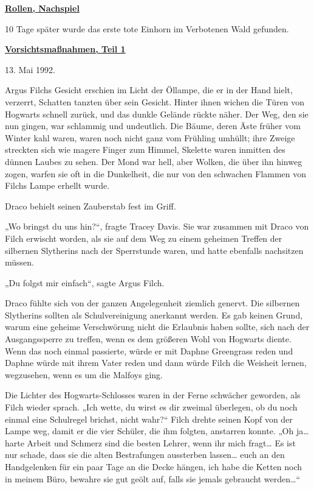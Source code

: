 

\hypertarget{rollen-nachspiel-vorsichtsmauxdfnahmen-teil-1}{%

\textbf{\uline{Rollen, Nachspiel}}

10 Tage später wurde das erste tote Einhorn im Verbotenen Wald gefunden.

\textbf{\uline{Vorsichtsmaßnahmen, Teil 1}}

13. Mai 1992.

Argus Filchs Gesicht erschien im Licht der Öllampe, die er in der Hand hielt, verzerrt, Schatten tanzten über sein Gesicht. Hinter ihnen wichen die Türen von Hogwarts schnell zurück, und das dunkle Gelände rückte näher. Der Weg, den sie nun gingen, war schlammig und undeutlich. Die Bäume, deren Äste früher vom Winter kahl waren, waren noch nicht ganz vom Frühling umhüllt; ihre Zweige streckten sich wie magere Finger zum Himmel, Skelette waren inmitten des dünnen Laubes zu sehen. Der Mond war hell, aber Wolken, die über ihn hinweg zogen, warfen sie oft in die Dunkelheit, die nur von den schwachen Flammen von Filchs Lampe erhellt wurde.

Draco behielt seinen Zauberstab fest im Griff.

„Wo bringst du uns hin?“, fragte Tracey Davis. Sie war zusammen mit Draco von Filch erwischt worden, als sie auf dem Weg zu einem geheimen Treffen der silbernen Slytherins nach der Sperrstunde waren, und hatte ebenfalls nachsitzen müssen.

„Du folgst mir einfach“, sagte Argus Filch.

Draco fühlte sich von der ganzen Angelegenheit ziemlich genervt. Die silbernen Slytherins sollten als Schulvereinigung anerkannt werden. Es gab keinen Grund, warum eine geheime Verschwörung nicht die Erlaubnis haben sollte, sich nach der Ausgangssperre zu treffen, wenn es dem größeren Wohl von Hogwarts diente. Wenn das noch einmal passierte, würde er mit Daphne Greengrass reden und Daphne würde mit ihrem Vater reden und dann würde Filch die Weisheit lernen, wegzusehen, wenn es um die Malfoys ging.

Die Lichter des Hogwarts-Schlosses waren in der Ferne schwächer geworden, als Filch wieder sprach. „Ich wette, du wirst es dir zweimal überlegen, ob du noch einmal eine Schulregel brichst, nicht wahr?“ Filch drehte seinen Kopf von der Lampe weg, damit er die vier Schüler, die ihm folgten, anstarren konnte. „Oh ja… harte Arbeit und Schmerz sind die besten Lehrer, wenn ihr mich fragt… Es ist nur schade, dass sie die alten Bestrafungen aussterben lassen… euch an den Handgelenken für ein paar Tage an die Decke hängen, ich habe die Ketten noch in meinem Büro, bewahre sie gut geölt auf, falls sie jemals gebraucht werden…“

}
